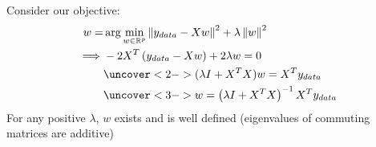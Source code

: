 

Consider our objective:
\begin{align*}
w =& \arg \min_{ w \in \mathbb{R}^{p}} \left\Vert y_{data}-Xw \right\Vert^2 + \lambda\left\Vert w\right\Vert^{2} \\
\implies & -2X^T\left(y_{data} - Xw\right) + 2\lambda w = 0\\
& \uncover<2->{(\lambda I + X^TX )w = X^Ty_{data}} \\
&  \uncover<3->{ w = \left(\lambda I + X^TX\right)^{-1} X^Ty_{data}}
\end{align*}
For any positive $\lambda$, $w$ exists and is well defined (eigenvalues of commuting  matrices are additive)